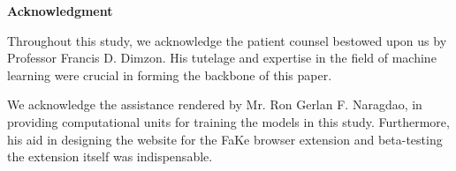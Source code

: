 \begin{center}
	\textbf{Acknowledgment}
\end{center}

Throughout this study, we acknowledge the patient counsel bestowed upon us by Professor Francis D. Dimzon. His tutelage and expertise in the field of machine learning were crucial in forming the backbone of this paper.

We acknowledge the assistance rendered by Mr. Ron Gerlan F. Naragdao, in providing computational units for training the models in this study. Furthermore, his aid in designing the website for the FaKe browser extension and beta-testing the extension itself was indispensable.